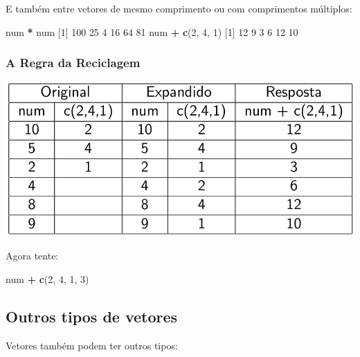 \documentclass[10pt,a4paper]{book}
\newenvironment{Shaded}{\begin{snugshade}}{\end{snugshade}}
\newcommand{\KeywordTok}[1]{\textcolor[rgb]{0.13,0.29,0.53}{\textbf{#1}}}
\newcommand{\DecValTok}[1]{\textcolor[rgb]{0.00,0.00,0.81}{#1}}
\newcommand{\StringTok}[1]{\textcolor[rgb]{0.31,0.60,0.02}{#1}}
\newcommand{\OperatorTok}[1]{\textcolor[rgb]{0.81,0.36,0.00}{\textbf{#1}}}
\newcommand{\NormalTok}[1]{#1}
\begin{document}
E também entre vetores de mesmo comprimento ou com comprimentos
múltiplos:

\begin{Shaded}
\begin{Highlighting}[]
\NormalTok{num }\OperatorTok{*}\StringTok{ }\NormalTok{num}
\NormalTok{[}\DecValTok{1}\NormalTok{] }\DecValTok{100}  \DecValTok{25}   \DecValTok{4}  \DecValTok{16}  \DecValTok{64}  \DecValTok{81}
\NormalTok{num }\OperatorTok{+}\StringTok{ }\KeywordTok{c}\NormalTok{(}\DecValTok{2}\NormalTok{, }\DecValTok{4}\NormalTok{, }\DecValTok{1}\NormalTok{)}
\NormalTok{[}\DecValTok{1}\NormalTok{] }\DecValTok{12}  \DecValTok{9}  \DecValTok{3}  \DecValTok{6} \DecValTok{12} \DecValTok{10}
\end{Highlighting}
\end{Shaded}

\subsubsection{A Regra da Reciclagem}\label{a-regra-da-reciclagem}

\begin{center}\includegraphics[width=0.8\linewidth]{img/reciclagem} \end{center}

Agora tente:

\begin{Shaded}
\begin{Highlighting}[]
\NormalTok{num }\OperatorTok{+}\StringTok{ }\KeywordTok{c}\NormalTok{(}\DecValTok{2}\NormalTok{, }\DecValTok{4}\NormalTok{, }\DecValTok{1}\NormalTok{, }\DecValTok{3}\NormalTok{)}
\end{Highlighting}
\end{Shaded}

\subsection{Outros tipos de vetores}\label{outros-tipos-de-vetores}

Vetores também podem ter outros tipos:
\end{document}
